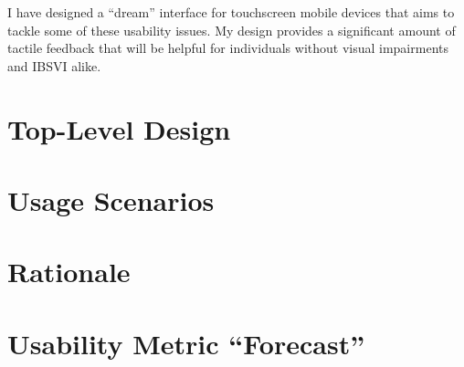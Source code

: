 \documentclass[11pt]{article}
\begin{document}
I have designed a ``dream'' interface for touchscreen mobile devices that aims to tackle some of these usability issues. My design provides a significant amount of tactile feedback that will be helpful for individuals without visual impairments and IBSVI alike.




\section{Top-Level Design}
\label{background}

\section{Usage Scenarios}

\section{Rationale}


\section{Usability Metric ``Forecast''}
\clearpage


{}

\end{document}

